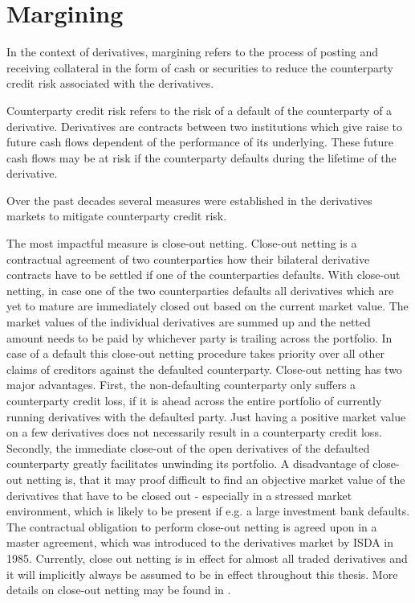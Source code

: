 \documentclass[../Thesis_AHoecherl.tex]{subfiles}
\begin{document}
\section{Margining}\label{Margining}

In the context of derivatives, margining refers to the process of posting and receiving collateral in the form of cash or securities to reduce the counterparty credit risk associated with the derivatives.

Counterparty credit risk refers to the risk of a default of the counterparty of a derivative. Derivatives are contracts between two institutions which give raise to future cash flows dependent of the performance of its underlying. These future cash flows may be at risk if the counterparty defaults during the lifetime of the derivative. 

Over the past decades several measures were established in the derivatives markets to mitigate counterparty credit risk.

The most impactful measure is close-out netting. Close-out netting is a contractual agreement of two counterparties how their bilateral derivative contracts have to be settled if one of the counterparties defaults. With close-out netting, in case one of the two counterparties defaults all derivatives which are yet to mature are immediately closed out based on the current market value. The market values of the individual derivatives are summed up and the netted amount needs to be paid by whichever party is trailing across the portfolio. In case of a default this close-out netting procedure takes priority over all other claims of creditors against the defaulted counterparty. Close-out netting has two major advantages. First, the non-defaulting counterparty only suffers a counterparty credit loss, if it is ahead across the entire portfolio of currently running derivatives with the defaulted party. Just having a positive market value on a few derivatives does not necessarily result in a counterparty credit loss. Secondly, the immediate close-out of the open derivatives of the defaulted counterparty greatly facilitates unwinding its portfolio. A disadvantage of close-out netting is, that it may proof difficult to find an objective market value of the derivatives that have to be closed out - especially in a stressed market environment, which is likely to be present if e.g. a large investment bank defaults. The contractual obligation to perform close-out netting is agreed upon in a master agreement, which was introduced to the derivatives market by ISDA in 1985. Currently, close out netting is in effect for almost all traded derivatives and it will implicitly always be assumed to be in effect throughout this thesis. More details on close-out netting may be found in \cite[Chapter~5]{gregory2015xva}.
\end{document}
